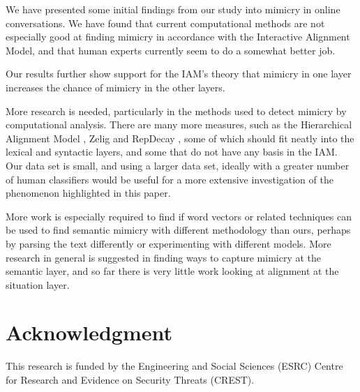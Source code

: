 \documentclass[conference]{IEEEtran}
\begin{document}
We have presented some initial findings from our study into mimicry in online conversations. We have found that current computational methods are not especially good at finding mimicry in accordance with the Interactive Alignment Model, and that human experts currently seem to do a somewhat better job.

Our results further show support for the IAM's theory that mimicry in one layer increases the chance of mimicry in the other layers.

More research is needed, particularly in the methods used to detect mimicry by computational analysis. There are many more measures, such as the Hierarchical Alignment Model \cite{doyle2016robust}, Zelig \cite{jones2014finding} and RepDecay \cite{reitter2006computational}, some of which should fit neatly into the lexical and syntactic layers, and some that do not have any basis in the IAM. Our data set is small, and using a larger data set, ideally with a greater number of human classifiers would be useful for a more extensive investigation of the phenomenon highlighted in this paper.

More work is especially required to find if word vectors or related techniques can be used to find semantic mimicry with different methodology than ours, perhaps by parsing the text differently or experimenting with different models. More research in general is suggested in finding ways to capture mimicry at the semantic layer, and so far there is very little work looking at alignment at the situation layer.


\section*{Acknowledgment}
This research is funded by the Engineering and Social Sciences (ESRC) Centre for Research and Evidence on Security Threats (CREST).



\printbibliography
\end{document}
